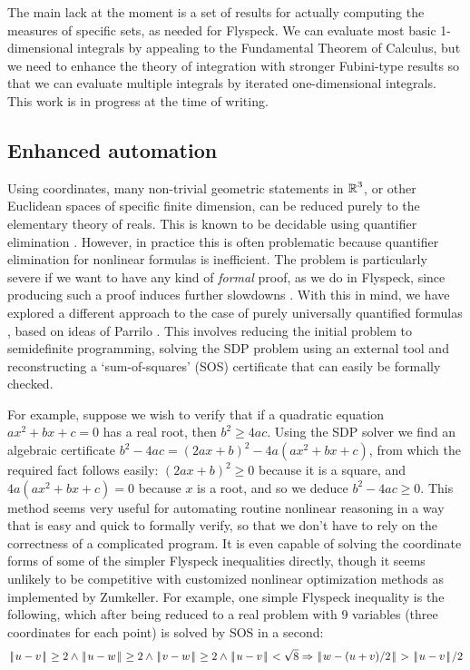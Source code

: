 \documentclass[11pt]{amsart}
\def\|{{\hskip0.1em|\hskip-0.15em|\hskip0.1em}}
\newcommand{\real}{\mbox{$\protect\mathbb R$}}
\let\And=\wedge                    %
\newcommand{\Imp}{\Rightarrow}
\begin{document}
The main lack at the moment is a set of results for actually computing the
measures of specific sets, as needed for Flyspeck. We can evaluate most basic
1-dimensional integrals by appealing to the Fundamental Theorem of Calculus,
but we need to enhance the theory of integration with stronger Fubini-type
results so that we can evaluate multiple integrals by iterated one-dimensional
integrals. This work is in progress at the time of writing.

\subsection*{Enhanced automation}

Using coordinates, many non-trivial geometric statements in $\real^3$, or other
Euclidean spaces of specific finite dimension, can be reduced purely to the
elementary theory of reals. This is known to be decidable using quantifier
elimination \cite{tarski-decision,collins,hormander-pdo2}. However, in practice
this is often problematic because quantifier elimination for nonlinear formulas
is inefficient. The problem is particularly severe if we want to have any kind
of {\em formal} proof, as we do in Flyspeck, since producing such a proof
induces further slowdowns \cite{mahboubi-hormander,mclaughlin-harrison}. With
this in mind, we have explored a different approach to the case of purely
universally quantified formulas \cite{harrison-sos}, based on ideas of Parrilo
\cite{parrilo-semidefinite}. This involves reducing the initial problem to
semidefinite programming, solving the SDP problem using an external tool and
reconstructing a `sum-of-squares' (SOS) certificate that can easily be formally
checked.

For example, suppose we wish to verify that if a quadratic equation $a x^2 + b
x + c = 0$ has a real root, then $b^2 \geq 4 a c$. Using the SDP solver we find
an algebraic certificate $b^2 - 4 a c = (2 a x + b)^2 - 4 a (a x^2 + b x + c)$,
from which the required fact follows easily: $(2 a x + b)^2 \geq 0$ because it
is a square, and $4 a (a x^2 + b x + c) = 0$ because $x$ is a root, and so we
deduce $b^2 - 4 a c \geq 0$. This method seems very useful for automating
routine nonlinear reasoning in a way that is easy and quick to formally verify,
so that we don't have to rely on the correctness of a complicated program. It
is even capable of solving the coordinate forms of some of the simpler Flyspeck
inequalities directly, though it seems unlikely to be competitive with
customized nonlinear optimization methods as implemented by Zumkeller. For
example, one simple Flyspeck inequality is the following, which after being
reduced to a real problem with 9 variables (three coordinates for each point)
is solved by SOS in a second:
$$ \|u - v\| \geq 2 \And \|u - w\| \geq 2 \And \|v - w\| \geq 2 \And
   \|u - v\| < \sqrt{8}
   \Imp \|w - (u + v)/2\| > \|u - v\|/2
$$
\end{document}
